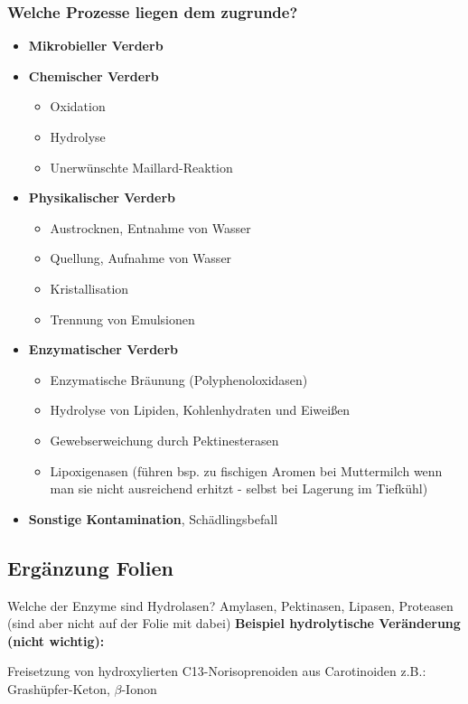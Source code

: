 \documentclass[a4paper,10pt,twoside]{article}
\begin{document}
\subsubsection{Welche Prozesse liegen dem zugrunde?}
\begin{itemize}
\item \textbf{Mikrobieller Verderb}
\item \textbf{Chemischer Verderb}
\begin{itemize}
\item Oxidation
\item Hydrolyse
\item Unerwünschte Maillard-Reaktion
\end{itemize}
\item \textbf{Physikalischer Verderb}
\begin{itemize}
\item Austrocknen, Entnahme von Wasser
\item Quellung, Aufnahme von Wasser
\item Kristallisation
\item Trennung von Emulsionen
\end{itemize}
\item \textbf{Enzymatischer Verderb}
\begin{itemize}
\item Enzymatische Bräunung (Polyphenoloxidasen)
\item Hydrolyse von Lipiden, Kohlenhydraten und Eiweißen
\item Gewebserweichung durch Pektinesterasen
\item Lipoxigenasen (führen bsp. zu fischigen Aromen bei Muttermilch wenn man sie nicht ausreichend erhitzt - selbst bei Lagerung im Tiefkühl)
\end{itemize}
\item \textbf{Sonstige Kontamination}, Schädlingsbefall
\end{itemize}
\subsection{Ergänzung Folien}
Welche der Enzyme sind Hydrolasen? \pp
Amylasen, Pektinasen, Lipasen, Proteasen (sind aber nicht auf der Folie mit dabei)
\pp
\pp\textbf{Beispiel hydrolytische Veränderung (nicht wichtig):} \par
Freisetzung von hydroxylierten C13-Norisoprenoiden aus Carotinoiden z.B.: Grashüpfer-Keton, $\beta$-Ionon
\end{document}
